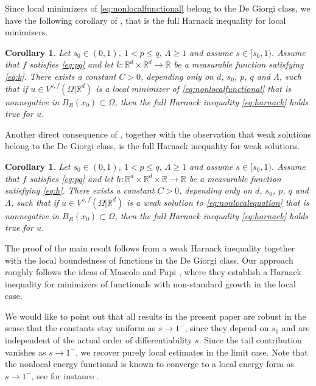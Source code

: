 \documentclass[11pt]{amsart}
\theoremstyle{plain}
\newtheorem{corollary}[theorem]{Corollary}
\theoremstyle{definition}
\numberwithin{equation}{section}
\newcommand{\R}{\mathbb{R}}
\newcommand{\Rd}{\mathbb{R}^d}
\begin{document}
Since local minimizers of \eqref{eq:nonlocalfunctional} belong to the De Giorgi class, we have the following corollary of , that is the full Harnack inequality for local minimizers.
\begin{corollary}
Let $s_0 \in (0,1)$, $1 < p \le q$, $\Lambda \geq 1$ and assume $s \in [s_0, 1)$. Assume that $f$ satisfies \eqref{eq:pq} and let $k: \Rd \times \Rd \to \R$ be a measurable function satisfying \eqref{eq:k}. There exists a constant $C > 0$, depending only on $d$, $s_0$, $p$, $q$ and $\Lambda$, such that if $u \in V^{s,f}(\Omega | \Rd)$ is a local minimizer of \eqref{eq:nonlocalfunctional} that is nonnegative in $B_{R}(x_0) \subset \Omega$, then the full Harnack inequality \eqref{eq:harnack} holds true for $u$.
\end{corollary}
Another direct consequence of , together with the observation that weak solutions belong to the De Giorgi class, is the full Harnack inequality for weak solutions.
\begin{corollary}
Let $s_0 \in (0,1)$, $1 < p \le q$, $\Lambda \geq 1$ and assume $s \in [s_0, 1)$. Assume that $f$ satisfies \eqref{eq:pq} and let $h: \Rd \times \Rd \times \R \to \R$ be a measurable function satisfying \eqref{eq:h}. There exists a constant $C > 0$, depending only on $d$, $s_0$, $p$, $q$ and $\Lambda$, such that if $u \in V^{s,f}(\Omega | \Rd)$ is a weak solution to \eqref{eq:nonlocalequation} that is nonnegative in $B_{R}(x_0) \subset \Omega$, then  the full Harnack inequality \eqref{eq:harnack} holds true for $u$.
\end{corollary}

The proof of the main result  follows from a weak Harnack inequality together with the local boundedness of functions in the De Giorgi class. Our approach roughly follows the ideas of Mascolo and Papi \cite{MascPapi96}, where they establish 
a Harnack inequality for minimizers of functionals with non-standard growth in the local case. 

We would like to point out that all results in the present paper are robust in the sense that the constants stay uniform as $s \to 1^{-}$, since they depend on $s_0$ and are independent of the actual order of differentiability $s$. Since the tail contribution vanishes as $s \to 1^{-}$, we recover purely local estimates in the limit case. Note that the nonlocal energy functional is known to converge to a local energy form as $s \to 1^{-}$, see for instance \cite{BoSa19, AlCiPi21}. 
\end{document}
